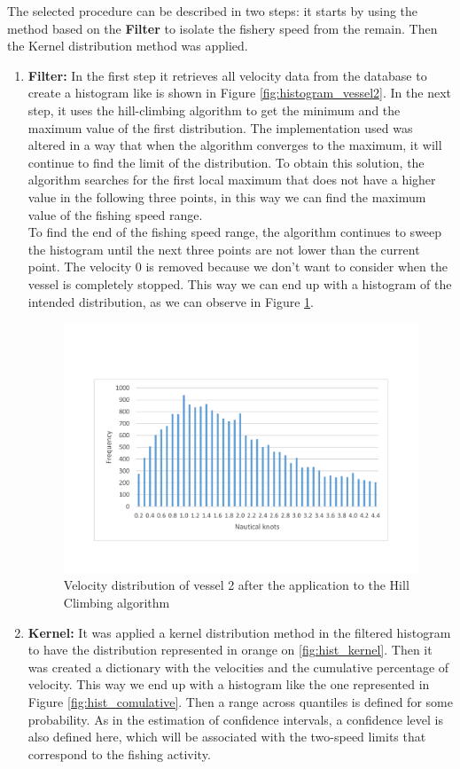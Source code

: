 The selected procedure can be described in two steps:  it starts by using the method based on the \textbf{Filter} to isolate the fishery speed from the remain. Then the Kernel distribution method was applied.
\begin{enumerate}
\item    \textbf{Filter:} In the first step it retrieves all velocity data from the database to create a histogram like is shown in Figure \ref{fig:histogram_vessel2}. In the next step, it uses the hill-climbing algorithm to get the minimum and the maximum value of the first distribution. 
The implementation used was altered in a way that when the algorithm converges to the maximum, it will continue to find the limit of the distribution.
To obtain this solution, the algorithm searches for the first local maximum that does not have a higher value in the following three points, in this way we can find the maximum value of the fishing speed range. \\
To find the end of the fishing speed range, the algorithm continues to sweep the histogram until the next three points are not lower than the current point.
The velocity 0 is removed because we don't want to consider when the vessel is completely stopped. 
This way we can end up with a histogram of the intended distribution, as we can observe in Figure  \ref{fig:sog_hill_climbing}.

\begin{figure}[H]
    \centering
    \includegraphics[trim=0 50 0 50,width=0.8\linewidth]{Chapters/img/sog_hill_climbing.pdf}
    \caption{Velocity distribution of vessel 2 after the application to the Hill Climbing algorithm}
    \label{fig:sog_hill_climbing}
\end{figure}


\item    \textbf{Kernel:} It was applied a kernel distribution method in the filtered histogram to have the distribution represented in orange on \ref{fig:hist_kernel}. Then it was created a dictionary with the velocities and the cumulative percentage of velocity. This way we end up with a histogram like the one represented in Figure \ref{fig:hist_comulative}.  
Then a range across quantiles is defined for some probability. As in the estimation of confidence intervals, a confidence level is also defined here, which will be associated with the two-speed limits that correspond to the fishing activity.
\end{enumerate}  

